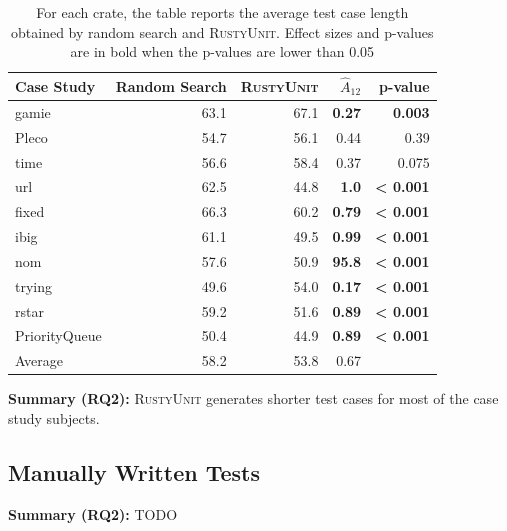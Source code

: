 \documentclass[paper=a4,%
  twoside,%
  BCOR4mm,%
  abstract=true,%
  toc=bibliography,%
  chapterprefix=true,%
  toc=bibliographynumbered,%
  open=right,%
  english,%
  pagesize=pdftex]{scrreprt}
\newcommand{\tech}{\textsc{RustyUnit}\xspace}
\begin{document}
\begin{table}[]
  \begin{tabular*}{\textwidth}{l @{\extracolsep{\fill}} rrrr}
  \hline
  \textbf{Case Study} & Random Search & \tech & \textbf{$\hat{A}_{12}$} & p-value \\
  \hline
  gamie & 63.1 & 67.1 & \textbf{0.27} & \textbf{0.003} \\
  Pleco & 54.7 & 56.1 & 0.44 & 0.39 \\
  time & 56.6 & 58.4 & 0.37 & 0.075 \\
  url & 62.5 & 44.8 & \textbf{1.0} & \textbf{< 0.001} \\
  fixed & 66.3 & 60.2 & \textbf{0.79} & \textbf{< 0.001} \\
  ibig & 61.1 & 49.5 & \textbf{0.99} & \textbf{< 0.001} \\
  nom & 57.6 & 50.9 & \textbf{95.8} & \textbf{< 0.001} \\
  trying & 49.6 & 54.0 & \textbf{0.17} & \textbf{< 0.001} \\
  rstar & 59.2 & 51.6 & \textbf{0.89} & \textbf{< 0.001} \\
  PriorityQueue & 50.4 & 44.9 & \textbf{0.89} & \textbf{< 0.001} \\
  \hline
  Average & 58.2 & 53.8 & 0.67 & \\
  \hline
  \end{tabular*}
\caption{\label{tab:results-ru-rs-length}For each crate, the table reports the average test case length obtained by random search and \tech. Effect sizes and p-values are in bold when the p-values are lower than 0.05}
\end{table}


\begin{tcolorbox}
\textbf{Summary (RQ2):} \tech generates shorter test cases for most of the case study subjects.
\end{tcolorbox}


\subsection{Manually Written Tests}
\begin{tcolorbox}
\textbf{Summary (RQ2):} TODO
\end{tcolorbox}
\end{document}
